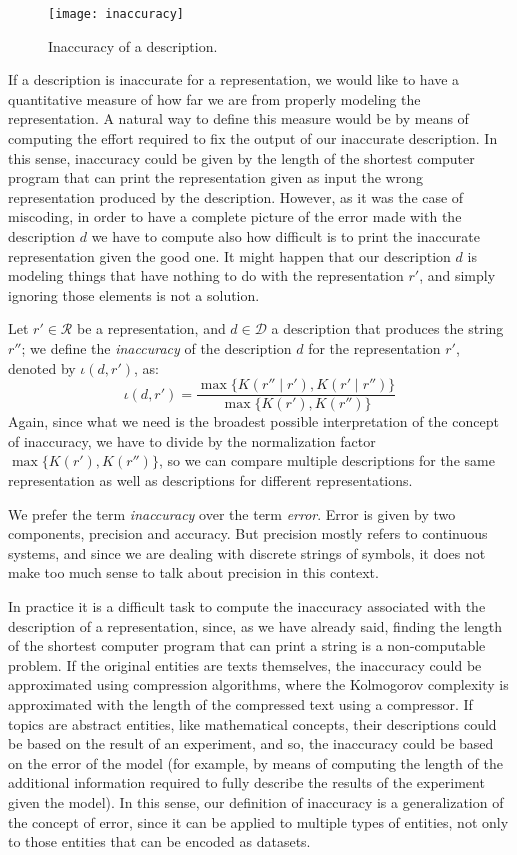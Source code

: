 \begin{figure}[h]
\centering\texttt{[image: inaccuracy]}
\caption{\label{fig:inaccuracy:inaccuracy:inaccuracy}Inaccuracy of a description.}
\end{figure}

If a description is inaccurate for a representation, we would like to have a quantitative measure of how far we are from properly modeling the representation. A natural way to define this measure would be by means of computing the effort required to fix the output of our inaccurate description. In this sense, inaccuracy could be given by the length of the shortest computer program that can print the representation given as input the wrong representation produced by the description. However, as it was the case of miscoding, in order to have a complete picture of the error made with the description $d$ we have to compute also how difficult is to print the inaccurate representation given the good one. It might happen that our description $d$ is modeling things that have nothing to do with the representation $r'$, and simply ignoring those elements is not a solution.

Let $r' \in \mathcal{R}$ be a representation, and $d \in \mathcal{D}$ a description that produces the string $r''$; we define the \emph{inaccuracy} of the description $d$ for the representation $r'$, denoted by $\iota(d, r')$, as:
\[
\iota(d, r') = \frac{ \max\{ K(r'' \mid r'), K(r' \mid r'') \} } { \max\{ K(r'), K(r'') \} }
\]
Again, since what we need is the broadest possible interpretation of the concept of inaccuracy, we have to divide by the normalization factor $\max\{ K(r'), K(r'') \}$, so we can compare multiple descriptions for the same representation as well as descriptions for different representations.

We prefer the term \emph{inaccuracy} over the term \emph{error}. Error is given by two components, precision and accuracy. But precision mostly refers to continuous systems, and since we are dealing with discrete strings of symbols, it does not make too much sense to talk about precision in this context.

In practice it is a difficult task to compute the inaccuracy associated with the description of a representation, since, as we have already said, finding the length of the shortest computer program that can print a string is a non-computable problem. If the original entities are texts themselves, the inaccuracy could be approximated using compression algorithms, where the Kolmogorov complexity is approximated with the length of the compressed text using a compressor. If topics are abstract entities, like mathematical concepts, their descriptions could be based on the result of an experiment, and so, the inaccuracy could be based on the error of the model (for example, by means of computing the length of the additional information required to fully describe the results of the experiment given the model). In this sense, our definition of inaccuracy is a generalization of the concept of error, since it can be applied to multiple types of entities, not only to those entities that can be encoded as datasets.

